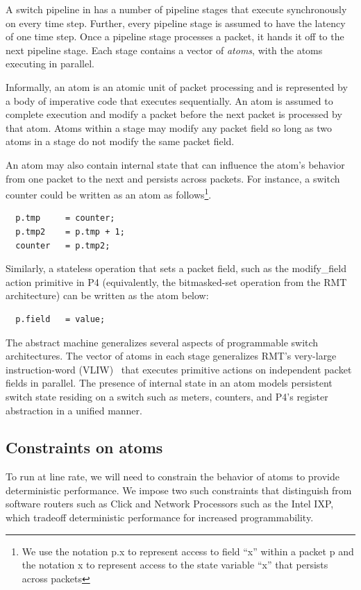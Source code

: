 A switch pipeline in \absmachine has a number of pipeline stages that execute
synchronously on every time step. Further, every pipeline stage is assumed to
have the latency of one time step. Once a pipeline stage processes a packet, it
hands it off to the next pipeline stage.  Each stage contains a vector of
\textit{atoms}, with the atoms executing in parallel.

Informally, an atom is an atomic unit of packet processing and is represented
by a body of imperative code that executes sequentially. An atom is assumed to
complete execution and modify a packet before the next packet is processed by
that atom. Atoms within a stage may modify any packet field so long as two
atoms in a stage do not modify the same packet field.

An atom may also contain internal state that can influence the atom's behavior
from one packet to the next and persists across packets. For instance, a switch
counter could be written as an atom as follows\footnote{We use the notation p.x
to represent access to field ``x'' within a packet p and the notation x to
represent access to the state variable ``x'' that persists across packets}.
\begin{verbatim}
  p.tmp     = counter;
  p.tmp2    = p.tmp + 1;
  counter   = p.tmp2;
\end{verbatim}
Similarly, a stateless operation that sets a packet field, such as the
modify\_field action primitive in P4 (equivalently, the bitmasked-set operation
from the RMT architecture) can be written as the atom below:
\begin{verbatim}
  p.field   = value;
\end{verbatim}

The \absmachine abstract machine generalizes several aspects of programmable
switch architectures. The vector of atoms in each stage generalizes RMT's
very-large instruction-word (VLIW)~\cite{rmt} that executes primitive actions
on independent packet fields in parallel. The presence of internal state in an
atom models persistent switch state residing on a switch such as meters,
counters, and P4's register abstraction in a unified manner.

\subsection{Constraints on atoms}

To run at line rate, we will need to constrain the behavior of atoms to provide
deterministic performance. We impose two such constraints that distinguish
\absmachine from software routers such as Click and Network Processors such as
the Intel IXP, which tradeoff deterministic performance for increased
programmability.

